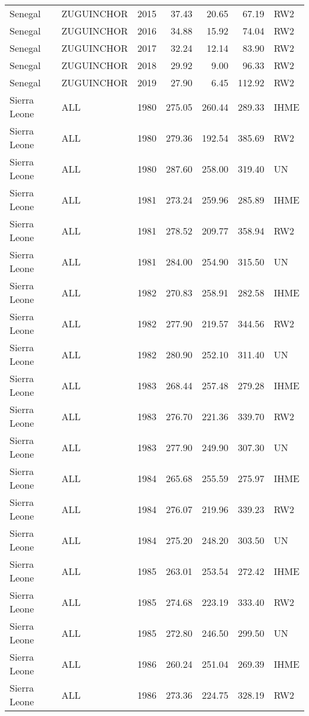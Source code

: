 \begin{longtable}{lllrrrl}
  Senegal & ZUGUINCHOR & 2015 & 37.43 & 20.65 & 67.19 & RW2 \\ 
  Senegal & ZUGUINCHOR & 2016 & 34.88 & 15.92 & 74.04 & RW2 \\ 
  Senegal & ZUGUINCHOR & 2017 & 32.24 & 12.14 & 83.90 & RW2 \\ 
  Senegal & ZUGUINCHOR & 2018 & 29.92 & 9.00 & 96.33 & RW2 \\ 
  Senegal & ZUGUINCHOR & 2019 & 27.90 & 6.45 & 112.92 & RW2 \\ 
  Sierra Leone & ALL & 1980 & 275.05 & 260.44 & 289.33 & IHME \\ 
  Sierra Leone & ALL & 1980 & 279.36 & 192.54 & 385.69 & RW2 \\ 
  Sierra Leone & ALL & 1980 & 287.60 & 258.00 & 319.40 & UN \\ 
  Sierra Leone & ALL & 1981 & 273.24 & 259.96 & 285.89 & IHME \\ 
  Sierra Leone & ALL & 1981 & 278.52 & 209.77 & 358.94 & RW2 \\ 
  Sierra Leone & ALL & 1981 & 284.00 & 254.90 & 315.50 & UN \\ 
  Sierra Leone & ALL & 1982 & 270.83 & 258.91 & 282.58 & IHME \\ 
  Sierra Leone & ALL & 1982 & 277.90 & 219.57 & 344.56 & RW2 \\ 
  Sierra Leone & ALL & 1982 & 280.90 & 252.10 & 311.40 & UN \\ 
  Sierra Leone & ALL & 1983 & 268.44 & 257.48 & 279.28 & IHME \\ 
  Sierra Leone & ALL & 1983 & 276.70 & 221.36 & 339.70 & RW2 \\ 
  Sierra Leone & ALL & 1983 & 277.90 & 249.90 & 307.30 & UN \\ 
  Sierra Leone & ALL & 1984 & 265.68 & 255.59 & 275.97 & IHME \\ 
  Sierra Leone & ALL & 1984 & 276.07 & 219.96 & 339.23 & RW2 \\ 
  Sierra Leone & ALL & 1984 & 275.20 & 248.20 & 303.50 & UN \\ 
  Sierra Leone & ALL & 1985 & 263.01 & 253.54 & 272.42 & IHME \\ 
  Sierra Leone & ALL & 1985 & 274.68 & 223.19 & 333.40 & RW2 \\ 
  Sierra Leone & ALL & 1985 & 272.80 & 246.50 & 299.50 & UN \\ 
  Sierra Leone & ALL & 1986 & 260.24 & 251.04 & 269.39 & IHME \\ 
  Sierra Leone & ALL & 1986 & 273.36 & 224.75 & 328.19 & RW2 \\ 

\end{longtable}
